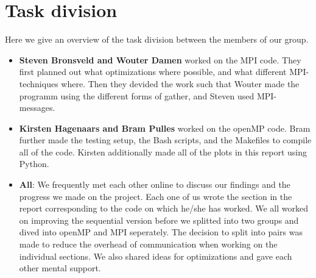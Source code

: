 \documentclass[a4paper]{article}
\begin{document}

\section{Task division}
Here we give an overview of the task division between the members of our group.
\begin{itemize}
    \item \textbf{Steven Bronsveld and Wouter Damen} worked on the MPI code. They first planned out what optimizations where possible, and what different MPI-techniques where. Then they devided the work such that Wouter made the programm using the different forms of gather, and Steven used MPI-messages.
    \item \textbf{Kirsten Hagenaars and Bram Pulles} worked on the openMP code. Bram further made the testing setup, the Bash scripts, and the Makefiles to compile all of the code. Kirsten additionally made all of the plots in this report using Python.
    \item \textbf{All}: We frequently met each other online to discuss our findings and the progress we made on the project. Each one of us wrote the section in the report corresponding to the code on which he/she has worked. We all worked on improving the sequential version before we splitted into two groups and dived into openMP and MPI seperately. The decision to split into pairs was made to reduce the overhead of communication when working on the individual sections. We also shared ideas for optimizations and gave each other mental support.
\end{itemize}
\end{document}
